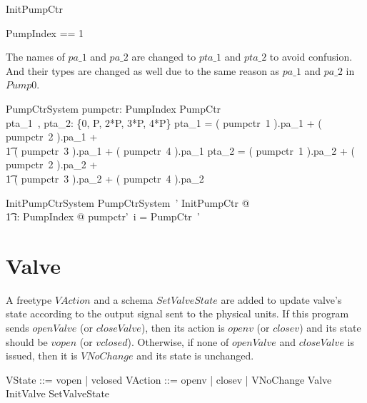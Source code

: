 \documentclass{report} %
\begin{document}
\begin{zed}
  InitPumpCtr 
\end{zed}

\begin{zed}
  PumpIndex == 1 
\end{zed}

The names of $pa\_1$ and $pa\_2$ are changed to $pta\_1$ and $pta\_2$ to avoid confusion. And their types are changed as well due to the same reason as $pa\_1$ and $pa\_2$ in $Pump0$.
\begin{schema}{PumpCtrSystem}
  pumpctr: PumpIndex \fun PumpCtr
  \\ %
  pta\_1~, pta\_2: \{0, P, 2*P, 3*P, 4*P\}
  \where %
  pta\_1 =
    ( pumpctr~1 ).pa\_1 + ( pumpctr~2 ).pa\_1 +  %
    \\ \t1 %
    ( pumpctr~3 ).pa\_1 + ( pumpctr~4 ).pa\_1   %
  \also %
  pta\_2 =
    ( pumpctr~1 ).pa\_2 + ( pumpctr~2 ).pa\_2 +  %
    \\ \t1 %
    ( pumpctr~3 ).pa\_2 + ( pumpctr~4 ).pa\_2  %
\end{schema}

\begin{schema}{InitPumpCtrSystem}
  PumpCtrSystem~'
  \where %
  \exists InitPumpCtr @
  \\ %
  \t1 \forall i: PumpIndex @ pumpctr'~i = \theta PumpCtr~'
\end{schema}

\section{Valve}

A freetype $VAction$ and a schema $SetValveState$ are added to update valve's state according to the output signal sent to the physical units. If this program sends $openValve$ (or $closeValve$), then its action is $openv$ (or $closev$) and its state should be $vopen$ (or $vclosed$). Otherwise, if none of $openValve$ and $closeValve$ is issued, then it is $VNoChange$ and its state is unchanged.
\begin{zed}
  VState ::= vopen | vclosed
  \also %
  VAction ::= openv | closev | VNoChange
  \also %
  Valve 
  \also %
  InitValve 
  \also %
  SetValveState 
\end{zed}
\end{document}
